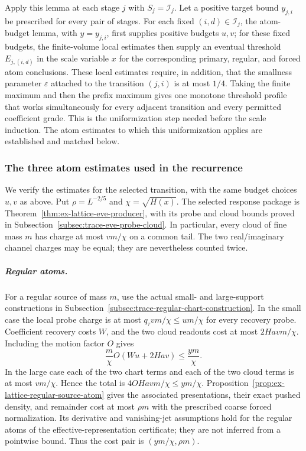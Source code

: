 Apply this lemma at each stage \(j\) with \(S_j=\mathcal I_j\). Let a
positive target bound \(y_{j,i}\) be prescribed for every pair of stages.
For each fixed \((i,d)\in\mathcal I_j\), the
atom-budget lemma, with \(y=y_{j,i}\), first supplies positive budgets
\(u,v\); for these fixed budgets, the
finite-volume local estimates then supply an eventual threshold
\(E_{j,(i,d)}\) in the scale variable \(x\) for the
corresponding primary, regular, and forced atom conclusions. These local
estimates require, in addition, that the smallness parameter
\(\varepsilon\) attached to the transition \((j,i)\) is at most \(1/4\). Taking the
finite maximum and then the prefix maximum gives one monotone threshold
profile that works simultaneously for every adjacent transition and every
permitted coefficient grade. This is the uniformization step needed before
the scale induction. The atom estimates to which this uniformization applies are established
and matched below.


\subsubsection{The three atom estimates used in the recurrence}
\label{subsec:trace-paid-atom-suppliers}
We verify the estimates for the selected transition, with the same
budget choices $u,v$ as above. Put $\rho=L^{-2/5}$ and
$\chi=\sqrt{H(x)}$. The selected response package is
Theorem~\ref{thm:ex-lattice-eve-producer}, with its probe and cloud
bounds proved in Subsection~\ref{subsec:trace-eve-probe-cloud}.
In particular, every cloud of fine mass $m$ has charge at most
$vm/\chi$ on a common tail. The two real/imaginary channel charges
may be equal; they are nevertheless counted twice.

\subparagraph{Regular atoms.}
For a regular source of mass $m$, use the actual small- and large-support
constructions in Subsection~\ref{subsec:trace-regular-chart-construction}.
In the small case the local probe charge is at most
$q_\tau vm/\chi\le um/\chi$ for every recovery probe.
Coefficient recovery costs $W$, and the two cloud readouts cost at most
$2Havm/\chi$. Including the motion factor $O$ gives
\[
 \frac{m}{\chi}O(Wu+2Hav)\le \frac{ym}{\chi}.
\]
In the large case each of the two chart terms and each of the two
cloud terms is at most $vm/\chi$. Hence the total is
$4OHavm/\chi\le ym/\chi$.
Proposition~\ref{prop:ex-lattice-regular-source-atom} gives the
associated presentations, their exact pushed density, and remainder
cost at most $\rho m$ with the prescribed coarse forced normalization.
Its derivative and vanishing-jet assumptions hold for the regular
atoms of the effective-representation certificate; they are not inferred
from a pointwise bound. Thus the cost pair is $(ym/\chi,\rho m)$.

